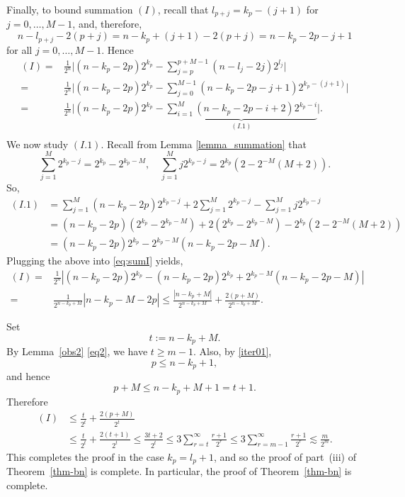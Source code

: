 \documentclass[11pt]{amsart}
\theoremstyle{definition}
\renewcommand{\1}{{\mathbbm{1}}}
\begin{document}
Finally, to bound summation $(I)$, recall that $l_{p+j} = k_p - (j+1)$ for $j=0,\ldots, M-1$, and, therefore, 
$$n-l_{p+j} -2(p+j)=n-k_p +(j+1) -2(p+j) =n-k_p - 2p-j+1$$
for all $j=0, \ldots, M-1$. 
Hence
\begin{equation}\label{eq:sumI}
    \begin{aligned}
    (I)= &\frac{1}{2^n}\Big|
    (n-k_p-2p){2^{k_p}} - \sum_{j=p}^{p+M-1} (n-l_j -2j) 2^{l_j}
    \Big| \\
    =& \frac{1}{2^n} \Big|
    (n-k_p-2p){2^{k_p}} -  \sum_{j=0}^{M-1} (n-k_p - 2p-j+1) 2^{ k_p-(j+1) }
    \Big|\\
    =& \frac{1}{2^n} \Big|
    (n-k_p-2p){2^{k_p}} - \underbrace{ \sum_{i=1}^{M} (n-k_p - 2p-i+2) 2^{ k_p-i }}_{(I.1)}
    \Big|.\\
\end{aligned}
\end{equation}
We now study $(I.1)$. Recall from Lemma \ref{lemma_summation} that
\[ \sum_{j=1}^{M} 2^{k_p-j} = 2^{k_p} - 2^{k_p-M} ,\quad \sum_{j=1}^{M}j 2^{k_p-j}=2^{k_p}(2-2^{-M}(M+2)).\]
So, %
\begin{align*}
    (I.1)%
    &=\sum_{j=1}^{M} (n-k_p - 2p)2^{k_p-j}+2\sum_{j=1}^{M} 2^{k_p-j} - \sum_{j=1}^{M} j2^{k_p-j} \\
    &= (n-k_p -2p)(2^{k_p}-2^{k_p-M})  +2 (2^{k_p}-2^{k_p-M})-2^{k_p}(2-2^{-M}(M+2))\\
    &= (n-k_p-2p) 2^{k_p} - 2^{k_p-M} (n-k_p- 2p-M).
\end{align*}
Plugging the above into \eqref{eq:sumI} yields,
\begin{align*}
    (I)=& \frac{1}{2^n}\left|(n-k_p-2p){2^{k_p}} -(n-k_p-2p) 2^{k_p} + 2^{k_p-M} (n-k_p- 2p-M) \right|\\
    =&\frac{1}{{2^{n-k_p+M}}}\left|{n-k_p-M-2p}\right|
    \leq  \frac{|n-k_p+M|}{2^{n-k_p+M}} + \frac{2(p+M)}{2^{n-k_p+M}}.
\end{align*}

Set
\[
t:=n-k_p+M.
\]
By Lemma~\ref{obs2} \eqref{eq2}, we have $t\ge m-1$. Also, by \eqref{iter01},
\[
p\le n-k_p+1,
\]
and hence
\[
p+M\le n-k_p+M+1=t+1.
\]
Therefore
\begin{align*}
(I)
&\le \frac{t}{2^t}+\frac{2(p+M)}{2^t}\\
&\le \frac{t}{2^t}+\frac{2(t+1)}{2^t}
\le \frac{3t+2}{2^t}
\le 3\sum_{r=t}^{\infty}\frac{r+1}{2^r}
\le 3\sum_{r=m-1}^{\infty}\frac{r+1}{2^r}
\lesssim \frac{m}{2^m}.
\end{align*}
This completes the proof in the case $k_p=l_p+1$,
and so the proof of part~(iii) of Theorem~\ref{thm-bn} is complete. In particular, the proof of Theorem~\ref{thm-bn} is complete.\\
\end{document}

